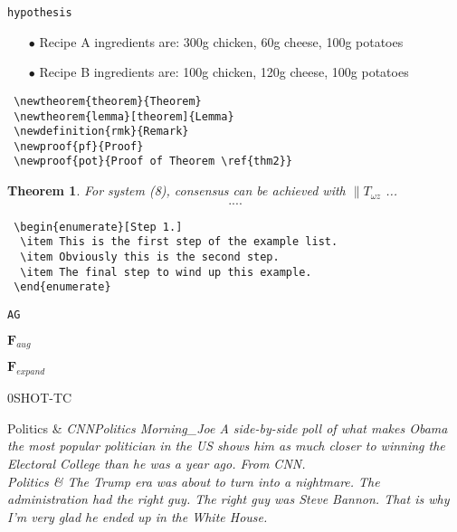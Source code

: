 
{\verb|hypothesis|}


\begin{enumerate}
\item[$\bullet$] Recipe A ingredients are: 300g chicken, 60g cheese, 100g potatoes
\item[$\bullet$] Recipe B ingredients are: 100g chicken, 120g cheese, 100g potatoes
\end{enumerate}


\begin{verbatim}
 \newtheorem{theorem}{Theorem}
 \newtheorem{lemma}[theorem]{Lemma}
 \newdefinition{rmk}{Remark}
 \newproof{pf}{Proof}
 \newproof{pot}{Proof of Theorem \ref{thm2}}
\end{verbatim}


\newtheorem{theorem}{Theorem}

\begin{theorem}
For system (8), consensus can be achieved with 
$\|T_{\omega z}$ ...
\begin{eqnarray}\label{10}
....
\end{eqnarray}
\end{theorem}


\begin{verbatim}
 \begin{enumerate}[Step 1.]
  \item This is the first step of the example list.
  \item Obviously this is the second step.
  \item The final step to wind up this example.
 \end{enumerate}
\end{verbatim}





{\verb|AG|}


$\mathbf{F}_{aug}$

$\mathbf{F}_{expand}$


\textsc{0SHOT-TC}



{Politics} &  \itshape{CNNPolitics Morning_Joe A side-by-side poll of what makes Obama the most popular politician in the US shows him as much closer to winning the Electoral College than he was a year ago. From CNN.} \\
{Politics}  & \itshape{The Trump era was about to turn into a nightmare. The administration had the right guy. The right guy was Steve Bannon. That is why I'm very glad he ended up in the White House.} \\


